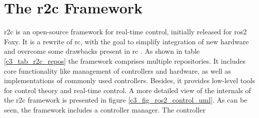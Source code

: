 \section{The \gls{r2c} Framework}\label{ros2_control}
\Gls{r2c} is an open-source framework for real-time control, initially released for  \gls{ros2} Foxy. It is a rewrite of \gls{rc}, with the goal to simplify integration of new hardware and overcome some drawbacks present in \gls{rc} \cite{noauthor_welcome_nodate, magyar_getting_started_with_ros2_control_2021, magyar_ros2_control_the_future_of_ros_control_2021}. As shown in table \ref{c3_tab_r2c_repos} the framework comprises multiple repositories. It includes core functionality like management of controllers and hardware, as well as implementations of commonly used controllers. Besides, it provides low-level tools for control theory and real-time control. \newline
A more detailed view of the internals of the \gls{r2c} framework is presented in figure \ref{c3_fig_ros2_control_uml}. As can be seen, the framework includes a controller manager. The controller 
